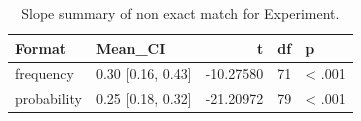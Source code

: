 \begin{table}
\centering
\caption{Slope summary of non exact match for Experiment.}
\centering
\fontsize{10}{12}\selectfont
\begin{tabular}[t]{llrrl}
\toprule
Format & Mean\_CI & t & df & p\\
\midrule
frequency & 0.30 [0.16, 0.43] & -10.27580 & 71 & < .001\\
probability & 0.25 [0.18, 0.32] & -21.20972 & 79 & < .001\\
\bottomrule
\end{tabular}
\end{table}
